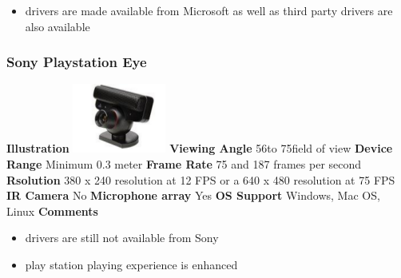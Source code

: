 \documentclass[a4paper,10pt]{report}
\begin{document}
\begin{itemize}
                                                                                                                                                                                                                                                                                                                                                                                                                                                                                                                                                                                                                                                                                                                                                                                                                                                                                                                                          
  \item drivers are made available from Microsoft as well as third party drivers are also available
  \end{itemize}

\subsubsection{Sony Playstation Eye}
\textbf{Illustration}\newline
\includegraphics{./sony.png}
\newline
\textbf{Viewing Angle} 56\textdegree to 75\textdegree field of view\newline
\textbf{Device Range} Minimum 0.3 meter\newline
\textbf{Frame Rate} 75 and 187 frames per second\newline
\textbf{Rsolution} 380 x 240 resolution at 12 FPS or a 640 x 480 resolution at 75 FPS \newline
\textbf{IR Camera} No\newline
\textbf{Microphone array} Yes\newline
\textbf{OS Support} Windows, Mac OS, Linux \newline
\textbf{Comments}
\begin{itemize}
 \item drivers are still not available from Sony
 \item play station playing experience is enhanced
\end{itemize}
\end{document}
